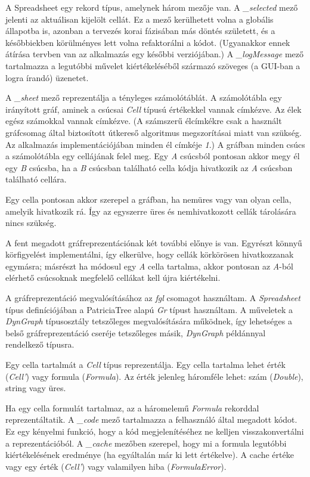 A Spreadsheet egy rekord típus, amelynek három mezője van. A \textit{\_selected} mező jelenti az aktuálisan kijelölt cellát. Ez a mező kerülhetett volna a globális állapotba is, azonban a tervezés korai fázisában más döntés született, és a későbbiekben körülményes lett volna refaktorálni a kódot. (Ugyanakkor ennek átírása tervben van az alkalmazás egy későbbi verziójában.) A \textit{\_logMessage} mező tartalmazza a legutóbbi művelet kiértékeléséből származó szöveges (a GUI-ban a logra írandó) üzenetet.

A \textit{\_sheet} mező reprezentálja a tényleges számolótáblát. A számolótábla egy irányított gráf, aminek a csúcsai \textit{Cell} típusú értékekkel vannak címkézve. Az élek egész számokkal vannak címkézve. (A számszerű élcímkékre csak a használt gráfcsomag által biztosított útkereső algoritmus megszorításai miatt van szükség. Az alkalmazás implementációjában minden él címkéje \textit{1}.) A gráfban minden csúcs a számolótábla egy cellájának felel meg. Egy \textit{A} csúcsból pontosan akkor megy él egy \textit{B} csúcsba, ha a \textit{B} csúcsban található cella kódja hivatkozik az \textit{A} csúcsban található cellára. 

Egy cella pontosan akkor szerepel a gráfban, ha nemüres vagy van olyan cella, amelyik hivatkozik rá. Így az egyszerre üres és nemhivatkozott cellák tárolására nincs szükség.

A fent megadott gráfreprezentációnak két további előnye is van. Egyrészt könnyű körfigyelést implementálni, így elkerülve, hogy cellák körkörösen hivatkozzanak egymásra; másrészt ha módosul egy \textit{A} cella tartalma, akkor pontosan az \textit{A}-ból elérhető csúcsoknak megfelelő cellákat kell újra kiértékelni.

A gráfreprezentáció megvalósításához az \textit{fgl} csomagot használtam. A \textit{Spreadsheet} típus definíciójában a PatriciaTree alapú \textit{Gr} típust használtam. A műveletek a \textit{DynGraph} típusosztály tetszőleges megvalósítására működnek, így lehetséges a belső gráfreprezentáció cseréje tetszőleges másik, \textit{DynGraph} példánnyal rendelkező típusra.

Egy cella tartalmát a \textit{Cell} típus reprezentálja. Egy cella tartalma lehet érték (\textit{Cell'}) vagy formula (\textit{Formula}). Az érték jelenleg háromféle lehet: szám (\textit{Double}), string vagy üres.

Ha egy cella formulát tartalmaz, az a háromelemű \textit{Formula} rekorddal reprezentáltatik. A \textit{\_code} mező tartalmazza a felhasználó által megadott kódot. Ez egy kényelmi funkció, hogy a kód megjelenítéséhez ne kelljen visszakonvertálni a reprezentációból. A \textit{\_cache} mezőben szerepel, hogy mi a formula legutóbbi kiértékelésének eredménye (ha egyáltalán már ki lett értékelve). A cache értéke vagy egy érték (\textit{Cell'}) vagy valamilyen hiba (\textit{FormulaError}). 

